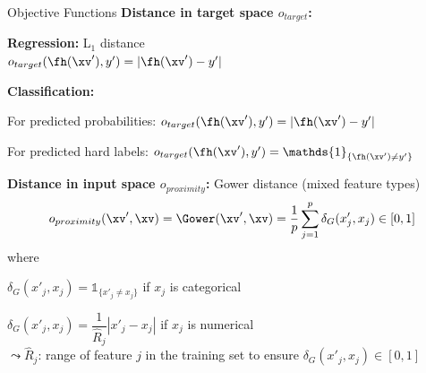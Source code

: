 \documentclass[10pt,compress,t,notes=noshow, xcolor=table]{beamer}
\begin{document}
\begin{framev}[align=top]{Objective Functions }
\textbf{Distance in target space $o_{target}$:}
\begin{itemizeM}
\item \textbf{Regression:} L$_1$ distance\\
$o_{target}(\fh(\xv'), y') = |\fh(\xv') - y'|$
\item \textbf{Classification:}
\begin{itemizeS}
\item For predicted probabilities: $o_{target}(\fh(\xv'), y') = |\fh(\xv') - y'|$ 
\vspace{0.1cm}
\item For predicted hard labels: $o_{target}(\fh(\xv'), y') = \mathds{1}_{\{\fh(\xv') \ne y'\}}$
\end{itemizeS}
\end{itemizeM}
\pause
\spacer[0.25]
\textbf{Distance in input space $o_{proximity}$:} Gower distance (mixed feature types)
$$
o_{proximity}(\xv', \xv) = \Gower(\xv', \xv) = \frac{1}{p} \sum_{j = 1}^{p} \delta_G(x'_j, x_j) \in [0, 1]
$$
where
\begin{itemizeM}
\item $\delta_G(x'_j, x_j) = \mathds{1}_{\{x'_j \ne x_j\}}$ if $x_j$ is categorical
\item $\delta_G(x'_j, x_j) = \dfrac{1}{\widehat{R}_j} |x'_j - x_j|$ if $x_j$ is numerical\\
$\leadsto \widehat{R}_j$: range of feature $j$ in the training set to ensure $\delta_G(x'_j, x_j) \in [0, 1]$
\end{itemizeM}
\end{framev}


\end{document}
